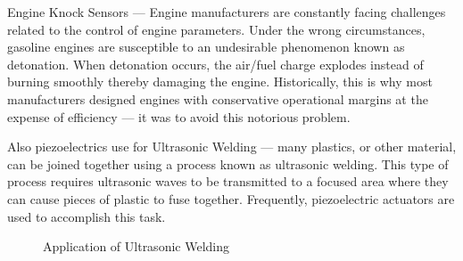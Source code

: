 \documentclass[a4paper,14pt]{extreport}
\begin{document}
Engine Knock Sensors — Engine manufacturers are constantly facing challenges related to the control of engine parameters. Under the wrong circumstances, gasoline engines are susceptible to an undesirable phenomenon known as detonation. When detonation occurs, the air/fuel charge explodes instead of burning smoothly thereby damaging the engine. Historically, this is why most manufacturers designed engines with conservative operational margins at the expense of efficiency — it was to avoid this notorious problem.\\
\begin{figure}[h!]
\end{figure}

\newpage
Also piezoelectrics use for Ultrasonic Welding — many plastics, or other material, can be joined together using a process known as ultrasonic welding. This type of process requires ultrasonic waves to be transmitted to a focused area where they can cause pieces of plastic to fuse together. Frequently, piezoelectric actuators are used to accomplish this task.\\
\begin{figure}[h!]
\caption{Application of Ultrasonic Welding}
\end{figure}
\end{document}
